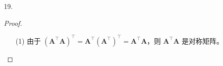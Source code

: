 \documentclass{sjtuarticle}
\begin{document}
\begin{itemize}
\begin{proof}
        考察
        \begin{equation*}
            \bm{A}=\begin{pmatrix}
                1 & a & a \\ a & 1 & a \\ a & a & 1
            \end{pmatrix}=\bm{D}-\bm{L}-\bm{U}=\begin{pmatrix}
                1 \\ & 1 \\ & & 1
            \end{pmatrix}-\begin{pmatrix}
                \\ -a \\ -a & -a & 
            \end{pmatrix}-\begin{pmatrix}
                & -a & -a \\ & & -a \\ & &
            \end{pmatrix}
        \end{equation*}
        在 Jacobi 迭代法中，迭代矩阵
        \begin{equation*}
            \bm{B}=\bm{D}^{-1}(\bm{L}+\bm{U})=\begin{pmatrix}
                1 \\ & 1 \\ & & 1
            \end{pmatrix}^{-1}\begin{pmatrix}
                & -a & -a \\
                -a & & -a \\
                -a & -a &
            \end{pmatrix}=\begin{pmatrix}
                & -a & -a \\
                -a & & -a \\
                -a & -a &
            \end{pmatrix}
        \end{equation*}
        考察它的特征值
        \begin{equation*}
            |\lambda \bm{E}-\bm{B}|=0\Rightarrow \left|\begin{matrix}
                \lambda & a & a \\
                a & \lambda & a \\
                a & a & \lambda
            \end{matrix}\right|=(\lambda-a)^2(\lambda+2a)=0\Rightarrow\lambda_{1,2} =a,\lambda_3=-\frac{1}{2a} 
        \end{equation*}
        为了使迭代法收敛，有 $|\lambda|<1$，则需要 $-\frac{1}{2}<a<\frac{1}{2}$。
    \end{proof}
    \item[19.]\begin{proof}
        \begin{itemize}
            \item[(1)] 由于 $(\bm{A}^\top\bm{A})^\top=\bm{A}^\top(\bm{A}^\top)^\top=\bm{A}^\top\bm{A}$，则 $\bm{A}^\top\bm{A}$ 是对称矩阵。
            

\end{itemize}
\end{proof}
\end{itemize}
\end{document}
